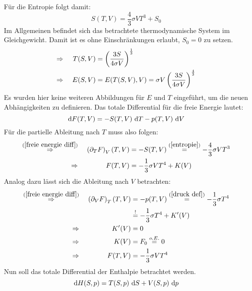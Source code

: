 			Für die Entropie folgt damit:
			\begin{equation}
				\label{entropie}
				S(T,V) = \dfrac{4}{3}\sigma VT^3 + S_0
			\end{equation}
			Im Allgemeinen befindet sich das betrachtete thermodynamische System im Gleichgewicht.
			Damit ist es ohne Einschränkungen erlaubt, $S_0 = 0$ zu setzen.
			\begin{alignat}{3}
				\Rightarrow&& \ T(S,V) &= \left(  \dfrac{3S}{4\sigma V}  \right)^{\frac{1}{3}} \nonumber \\
				\label{energie pot}
				\Rightarrow&& \ E(S,V) &= E(T(S,V),V) = \sigma V\left(  \dfrac{3S}{4\sigma V}  \right)^{\frac{4}{3}}
			\end{alignat}
			Es wurden hier keine weiteren Abbildungen für $E$ und $T$ eingeführt, um die neuen Abhängigkeiten zu definieren.
			Das totale Differential für die freie Energie  lautet:
			\begin{equation}
				\label{freie energie diff}
				\mathrm{d} F(T,V) = -S(T,V)\ \mathrm{d} T - p(T,V)\ \mathrm{d} V
			\end{equation}
			Für die partielle Ableitung nach $T$ muss also folgen:
			\begin{alignat}{3}
				\overset{(\ref{freie energie diff})}{\Rightarrow}&& \ \left( \partial_T F \right)_V(T,V) &= -S(T,V) \overset{(\ref{entropie})}{=} -\dfrac{4}{3}\sigma VT^3 \nonumber \\
				\Rightarrow&& \ F(T,V) &= -\dfrac{1}{3}\sigma VT^4 + K(V)
			\end{alignat}
			Analog dazu lässt sich die Ableitung nach $V$ betrachten:
			\begin{alignat}{3}
				\overset{(\ref{freie energie diff})}{\Rightarrow}&& \ \left( \partial_V F \right)_T(T,V) &= -p(T,V) \overset{(\ref{druck def})}{=} -\dfrac{1}{3}\sigma T^4 \nonumber \\
				&& &\overset{!}{=} -\dfrac{1}{3}\sigma T^4 + K^\prime(V) \nonumber \\
				\Rightarrow&& \ K^\prime(V) &= 0 \nonumber \\
				\Rightarrow&& \ K(V) &= F_0 \overset{o.E.}{=} 0 \nonumber \\
				\label{freie energie pot}
				\Rightarrow&& \ F(T,V) &= -\dfrac{1}{3}\sigma VT^4
			\end{alignat}
			Nun soll das totale Differential der Enthalpie  betrachtet werden.
			\begin{equation}
				\label{enthalpie diff}
				\mathrm{d} H(S,p) = T(S,p)\ \mathrm{d} S + V(S,p)\ \mathrm{d} p
			\end{equation}
